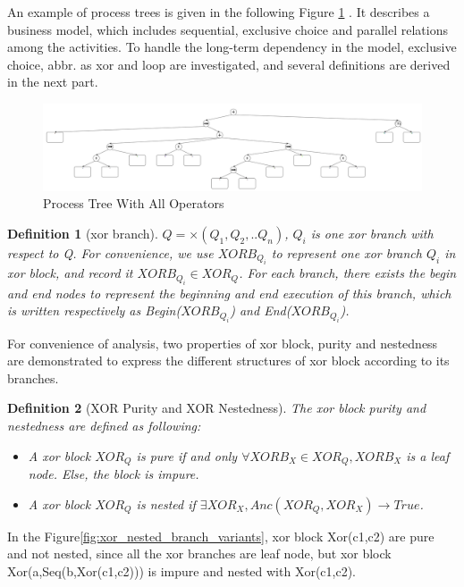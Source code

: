 \documentclass[]{article}
\newtheorem{mydef}{Definition}[section]
\begin{document}
An example of process trees is given in the following Figure \ref{fig:not_nested_overview} . It describes a business model, which includes sequential, exclusive choice and parallel relations among the activities. To handle the long-term dependency in the model, exclusive choice, abbr. as xor  and loop are investigated, and several definitions are derived in the next part.
\begin{figure}[h!]
	\includegraphics[width=\textwidth]{PT01_Not_Nested_Overview.png}
	\caption{Process Tree With All Operators}
	\label{fig:not_nested_overview}
\end{figure}
\begin{mydef}[xor branch]
   $Q= \times(Q_1 , Q_2 ,.. Q_n)$, $Q_i$ is one xor branch with respect to Q. For convenience, we use $XORB_{Q_i}$ to represent one xor branch $Q_i$ in xor block, and record it $XORB_{Q_i} \in XOR_{Q}$. For each branch, there exists the begin and end nodes to represent the beginning and end execution of this branch, which is written respectively as Begin($XORB_{Q_i}$) and End($XORB_{Q_i}$).
\end{mydef}
For convenience of analysis, two properties of xor block, purity and nestedness are demonstrated to express the different structures of xor block according to its branches.
\begin{mydef}[XOR Purity and XOR Nestedness] The xor block purity and nestedness are defined as following: \\
	\begin{itemize}
		\item A xor block $XOR_Q$ is pure if and only $\forall XORB_X \in XOR_Q, XORB_X $ is a leaf node. Else, the block is impure.
		\item A xor block $XOR_Q$ is nested if $ \exists XOR_X, Anc(XOR_Q, XOR_X) \rightarrow True  $.
	\end{itemize}
\end{mydef}
In the Figure\ref {fig:xor_nested_branch_variants}, xor block Xor(c1,c2) are pure and not nested, since all the xor branches are leaf node, but xor block Xor(a,Seq(b,Xor(c1,c2))) is impure and nested with Xor(c1,c2). 
\end{document}
